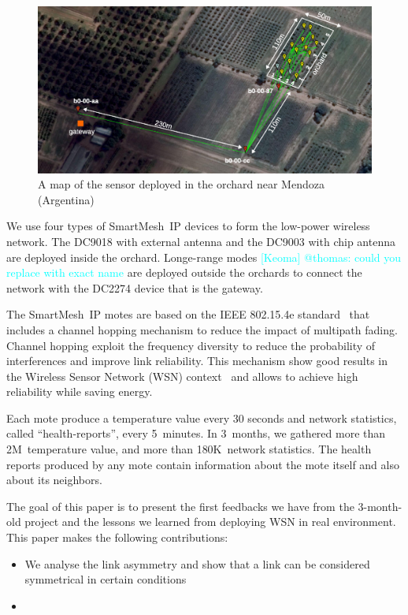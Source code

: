 \documentclass{sig-alternate}
\newcommand{\keoma}[1]              {\textcolor{cyan}{[Keoma] #1}}
\newcommand{\smip}                  {SmartMesh~IP\xspace}
\begin{document}
\begin{figure}
    \centering
    \includegraphics[width=\textwidth]{map_annotated}
    \caption{A map of the sensor deployed in the orchard near Mendoza (Argentina)}
    \label{fig:map}
\end{figure}


We use four types of \smip devices to form the low-power wireless network.
The DC9018 with external antenna and the DC9003 with chip antenna are deployed inside the orchard.
Longe-range modes \keoma{@thomas: could you replace with exact name} are deployed outside the orchards to connect the network with the DC2274 device that is the gateway.


The \smip motes are based on the IEEE 802.15.4e standard~\cite{std_ieee802154e} that includes a channel hopping mechanism to reduce the impact of multipath fading.
Channel hopping exploit the frequency diversity to reduce the probability of interferences and improve link reliability.
This mechanism show good results in the Wireless Sensor Network (WSN) context~\cite{watteyne2010mitigating, watteyne2009reliability} and allows to achieve high reliability while saving energy.


Each mote produce a temperature value every 30 seconds and network statistics, called ``health-reports'', every 5~minutes.
In 3~months, we gathered more than 2M~temperature value, and more than 180K~network statistics.
The health reports produced by any mote contain information about the mote itself and also about its neighbors.



The goal of this paper is to present the first feedbacks we have from the 3-month-old project and the lessons we learned from deploying WSN in real environment.
This paper makes the following contributions:
\begin{itemize}
    \item{We analyse the link asymmetry and show that a link can be considered symmetrical in certain conditions}
    \item{}
\end{itemize}
\end{document}
